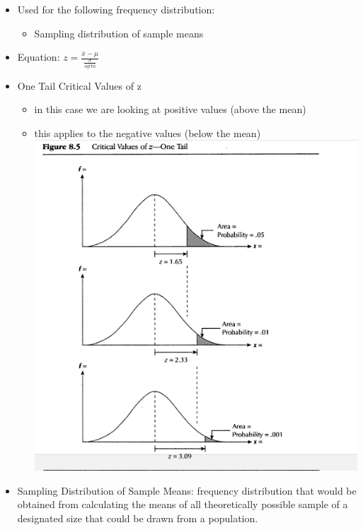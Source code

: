 \documentclass[]{article}
\begin{document}
\begin{itemize}
\itemsep1pt\parskip0pt
\item
  Used for the following frequency distribution:

  \begin{itemize}
  \itemsep1pt\parskip0pt
  \item
    Sampling distribution of sample means
  \end{itemize}
\item
  Equation: $z = \frac{\bar{x}-\mu}{\frac{\sigma}{sqrt{n}}}$
\item
  One Tail Critical Values of z

  \begin{itemize}
  \itemsep1pt\parskip0pt
  \item
    in this case we are looking at positive values (above the mean)
  \item
    this applies to the negative values (below the mean)
    \includegraphics{z1tail.png}
  \end{itemize}
\item
  Sampling Distribution of Sample Means: frequency distribution that
  would be obtained from calculating the means of all theoretically
  possible sample of a designated size that could be drawn from a
  population.
\end{itemize}
\end{document}
